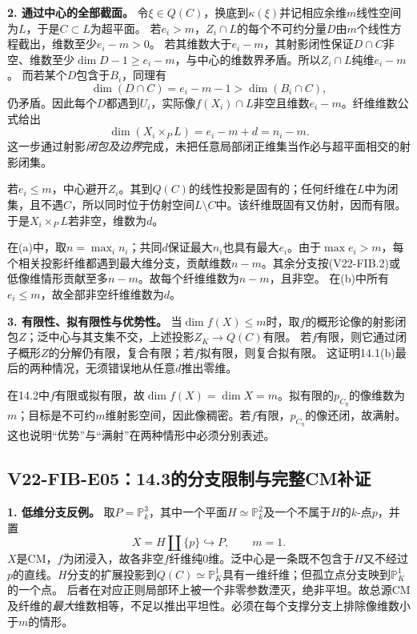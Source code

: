 \documentclass[UTF8,a4paper]{ctexbook}
\begin{document}
\noindent\textbf{2. 通过中心的全部截面。}
令$\xi\in Q(C)$，换底到$\kappa(\xi)$并记相应余维$m$线性空间为$L$，于是$C\subset L$为超平面。
若$e_i>m$，$Z_i\cap L$的每个不可约分量$D$由$m$个线性方程截出，维数至少$e_i-m>0$。
若其维数大于$e_i-m$，其射影闭性保证$D\cap C$非空、维数至少$\dim D-1\geq e_i-m$，与中心的维数界矛盾。所以$Z_i\cap L$纯维$e_i-m$。
而若某个$D$包含于$B_i$，同理有
\[
\dim(D\cap C)=e_i-m-1>\dim(B_i\cap C),
\]
仍矛盾。因此每个$D$都遇到$U_i$，实际像$f(X_i)\cap L$非空且维数$e_i-m$。纤维维数公式给出
\[
\dim(X_i\times_P L)=e_i-m+d=n_i-m.
\tag{V22-FIB.2}
\]
这一步通过射影\emph{闭包及边界}完成，未把任意局部闭正维集当作必与超平面相交的射影闭集。

若$e_i\leq m$，中心避开$Z_i$。其到$Q(C)$的线性投影是固有的；任何纤维在$L$中为闭集，且不遇$C$，所以同时位于仿射空间$L\setminus C$中。该纤维既固有又仿射，因而有限。于是$X_i\times_P L$若非空，维数为$d$。

在(a)中，取$n=\max_i n_i$；共同$d$保证最大$n_i$也具有最大$e_i$。由于$\max e_i>m$，每个相关投影纤维都遇到最大维分支，贡献维数$n-m$。其余分支按(V22-FIB.2)或低像维情形贡献至多$n-m$。故每个纤维维数为$n-m$，且非空。
在(b)中所有$e_i\leq m$，故全部非空纤维维数为$d$。

\noindent\textbf{3. 有限性、拟有限性与优势性。}
当$\dim f(X)\leq m$时，取$f$的概形论像的射影闭包$Z$；泛中心与其支集不交，上述投影$Z_K\to Q(C)$有限。
若$f$有限，则它通过闭子概形$Z$的分解仍有限，复合有限；若$f$拟有限，则复合拟有限。
这证明14.1(b)最后的两种情况，无须错误地从任意$d$推出零维。

在14.2中$f$有限或拟有限，故$\dim f(X)=\dim X=m$。拟有限的$p_{C_\eta}$的像维数为$m$；目标是不可约$m$维射影空间，因此像稠密。若$f$有限，$p_{C_\eta}$的像还闭，故满射。这也说明“优势”与“满射”在两种情形中必须分别表述。

\subsection*{V22-FIB-E05：14.3的分支限制与完整CM补证}

\noindent\textbf{1. 低维分支反例。}
取$P=\mathbb P^3_k$，其中一个平面$H\simeq\mathbb P^2_k$及一个不属于$H$的$k$-点$p$，并置
\[
X=H\amalg\{p\}\hookrightarrow P,\qquad m=1.
\]
$X$是CM，$f$为闭浸入，故各非空$f$纤维纯0维。泛中心是一条既不包含于$H$又不经过$p$的直线。$H$分支的扩展投影到$Q(C)\simeq\mathbb P^1_K$具有一维纤维；但孤立点分支映到$\mathbb P^1_K$的一个点。
后者在对应正则局部环上被一个非零参数湮灭，绝非平坦。故总源CM及纤维的\emph{最大}维数相等，不足以推出平坦性。必须在每个支撑分支上排除像维数小于$m$的情形。
\end{document}
